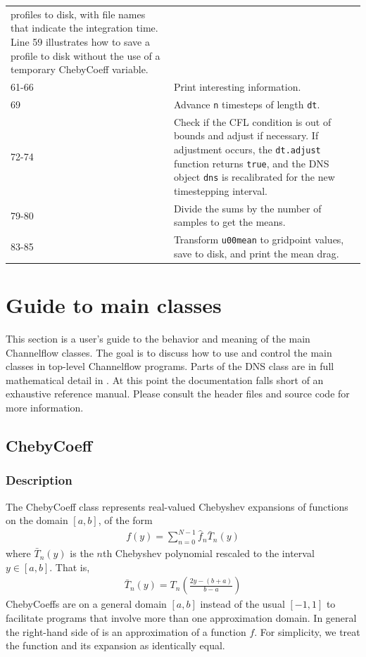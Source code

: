 \documentclass{article}[12pt]
\begin{document}
\begin{tabular}{p{2cm}p{12cm}}
profiles to disk, with file names that indicate the integration time.
Line 59 illustrates how to save a profile to disk without the use of
a temporary ChebyCoeff variable.
\\
61-66 & Print interesting information.
\\
 69 & Advance {\tt n} timesteps of length {\tt dt}.
\\
72-74 & Check if the CFL condition is out of bounds and
adjust if necessary. If adjustment occurs, the {\tt dt.adjust}
function returns {\tt true}, and the DNS object {\tt dns} is
recalibrated for the new timestepping interval.
\\
79-80 & Divide the sums by the number of samples to get the means.
\\
83-85 & Transform {\tt u00mean} to gridpoint values, save to disk,
 and print the mean drag.
\end{tabular}


\section{Guide to main classes}
\label{sec:chebyshev}

This section is a user's guide to the behavior and meaning of the main
Channelflow classes. The goal is to discuss how to use and control the
main classes in top-level Channelflow programs. Parts of the DNS
class are in full mathematical detail in . At this
point the documentation falls short of an exhaustive reference manual.
Please consult the header files and source code for more information.

\subsection{ChebyCoeff}
\label{sec:chebycoeff}

\subsubsection{Description}

The ChebyCoeff class represents real-valued Chebyshev expansions
of functions on the domain $[a,b]$, of the form
\begin{align}
f(y) = \sum_{n=0}^{N-1} \widehat{f}_n \bar{T}_n(y)
\label{eqn:chebyexpan}
\end{align}
where $\bar{T}_n(y)$ is the $n$th Chebyshev polynomial rescaled to the
interval $y \in [a,b]$. That is,
\begin{align}
\bar{T}_n(y) = T_n\left(\frac{2y-(b+a)}{b-a}\right)
\end{align}
ChebyCoeffs are on a general domain $[a,b]$ instead of the usual $[-1,
1]$ to facilitate programs that involve more than one approximation
domain. In general the right-hand side of  is an
approximation of a function $f$. For simplicity, we treat the function
and its expansion as identically equal.
\end{document}
